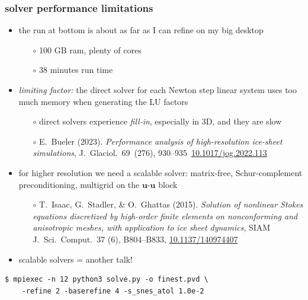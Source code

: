 \documentclass[10pt,
               hyperref={colorlinks,citecolor=DeepPink4,linkcolor=black,urlcolor=blue},
               svgnames]{beamer}
\newcommand{\bu}{\mathbf{u}}
\begin{document}
\begin{frame}[fragile]
\frametitle{solver performance limitations}

\begin{itemize}
\item the run at bottom is about as far as I can refine on my big desktop
    \begin{itemize}
    \item[$\circ$] 100 GB ram, plenty of cores
    \item[$\circ$] 38 minutes run time
    \end{itemize}
\item \alert{\emph{limiting factor:} the direct solver for each Newton step linear system uses too much memory when generating the LU factors}
    \begin{itemize}
    \item[$\circ$] direct solvers experience \emph{fill-in}, especially in 3D, and they are slow
    \item[$\circ$] {\scriptsize E.~Bueler (2023). \emph{Performance analysis of high-resolution ice-sheet simulations}, J.~Glaciol.~69~(276), 930--935\, \href{https://doi.org/10.1017/jog.2022.113}{10.1017/jog.2022.113}}
    \end{itemize}
\item for higher resolution we need a scalable solver: matrix-free, Schur-complement preconditioning, multigrid on the $\bu$-$\bu$ block
    \begin{itemize}
    \item[$\circ$] {\scriptsize T.~Isaac, G.~Stadler, \& O.~Ghattas (2015). \emph{Solution of nonlinear Stokes equations discretized by high-order finite elements on nonconforming and anisotropic meshes, with application to ice sheet dynamics}, SIAM J.~Sci.~Comput.~37 (6), B804--B833, \href{https://doi.org/10.1137/140974407}{10.1137/140974407}}
    \end{itemize}
\item scalable solvers = another talk!
\end{itemize}

\bigskip
\begin{Verbatim}
$ mpiexec -n 12 python3 solve.py -o finest.pvd \
    -refine 2 -baserefine 4 -s_snes_atol 1.0e-2
\end{Verbatim}
\end{frame}
\end{document}
